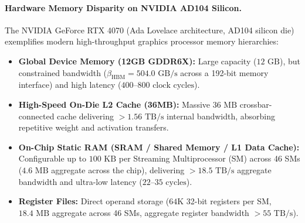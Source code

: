 \paragraph{Hardware Memory Disparity on NVIDIA AD104 Silicon.}
The NVIDIA GeForce RTX 4070 (Ada Lovelace architecture, AD104 silicon die) exemplifies modern high-throughput graphics processor memory hierarchies:
\begin{itemize}
\item \textbf{Global Device Memory (12GB GDDR6X):} Large capacity ($12\text{ GB}$), but constrained bandwidth ($\beta_{\text{HBM}} = 504.0\text{ GB/s}$ across a 192-bit memory interface) and high latency ($400\text{--}800\text{ clock cycles}$).
\item \textbf{High-Speed On-Die L2 Cache (36MB):} Massive $36\text{ MB}$ crossbar-connected cache delivering $>1.56\text{ TB/s}$ internal bandwidth, absorbing repetitive weight and activation transfers.
\item \textbf{On-Chip Static RAM (SRAM / Shared Memory / L1 Data Cache):} Configurable up to $100\text{ KB}$ per Streaming Multiprocessor (SM) across 46 SMs ($4.6\text{ MB}$ aggregate across the chip), delivering $>18.5\text{ TB/s}$ aggregate bandwidth and ultra-low latency ($22\text{--}35\text{ cycles}$).
\item \textbf{Register Files:} Direct operand storage ($64\text{K}$ 32-bit registers per SM, $18.4\text{ MB}$ aggregate across 46 SMs, aggregate register bandwidth $>55\text{ TB/s}$).
\end{itemize}


